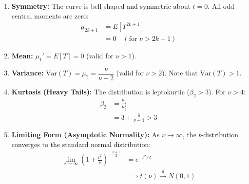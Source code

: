 \documentclass[12pt,a4paper]{article}
\begin{document}
\begin{tcolorbox}[formulabox, title={\textbf{Key Properties of Student's $t$-Distribution}}]
\begin{enumerate}[leftmargin=14pt, itemsep=2pt]
  \item \textbf{Symmetry:} The curve is bell-shaped and symmetric about $t = 0$. All odd central moments are zero:
  \begin{equation}
    \begin{aligned}
      \mu_{2k+1} &= E[T^{2k+1}] \\[3pt]
      &= 0 \quad (\text{for } \nu > 2k+1)
    \end{aligned}
  \end{equation}
  \item \textbf{Mean:} $\mu_1' = E[T] = 0$ (valid for $\nu > 1$).
  \item \textbf{Variance:} $\mathrm{Var}(T) = \mu_2 = \dfrac{\nu}{\nu - 2}$ (valid for $\nu > 2$). Note that $\mathrm{Var}(T) > 1$.
  \item \textbf{Kurtosis (Heavy Tails):} The distribution is leptokurtic ($\beta_2 > 3$). For $\nu > 4$:
  \begin{equation}
    \begin{aligned}
      \beta_2 &= \frac{\mu_4}{\mu_2^2} \\[3pt]
      &= 3 + \frac{6}{\nu - 4} > 3
    \end{aligned}
  \end{equation}
  \item \textbf{Limiting Form (Asymptotic Normality):} As $\nu \to \infty$, the $t$-distribution converges to the standard normal distribution:
  \begin{equation}
    \begin{aligned}
      \lim_{\nu \to \infty} \left(1 + \frac{t^2}{\nu}\right)^{-\frac{\nu+1}{2}} &= e^{-t^2/2} \\[3pt]
      &\implies t(\nu) \xrightarrow{d} N(0, 1)
    \end{aligned}
  \end{equation}
\end{enumerate}
\end{tcolorbox}
\end{document}
